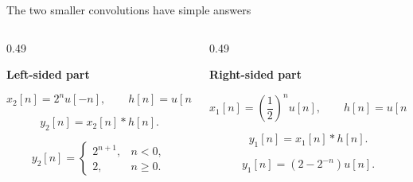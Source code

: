 \documentclass[aspectratio=169,11pt]{beamer}
\newcommand{\CardTitleSize}{\large}
\newcommand{\CardTitle}[1]{%
  \vspace{0.15cm}
  {\CardTitleSize\bfseries #1}\par
}
\begin{document}
\begin{frame}{The two smaller convolutions have simple answers}

\begin{columns}[c,totalwidth=\textwidth]






\begin{column}{0.49\textwidth}
\begin{OrangeCard}[halign=center,top=10pt,bottom=10pt]
\CardTitle{Left-sided part}

\vspace{0.04cm}

\[
x_2[n]=2^n u[-n],
\qquad
h[n]=u[n].
\]

\vspace{0.06cm}

\[
y_2[n]=x_2[n]*h[n].
\]

\vspace{0.06cm}

\[
y_2[n]=
\begin{cases}
2^{n+1}, & n<0,\\[3pt]
2, & n\ge 0.
\end{cases}
\]



\end{OrangeCard}
\end{column}






\begin{column}{0.49\textwidth}
\begin{BlueCard}[halign=center,top=10pt,bottom=10pt]
\CardTitle{Right-sided part}

\vspace{0.04cm}

\[
x_1[n]=\left(\frac12\right)^n u[n],
\qquad
h[n]=u[n].
\]

\vspace{0.06cm}

\[
y_1[n]=x_1[n]*h[n].
\]

\vspace{0.06cm}

\[
y_1[n]
=
\left(2-2^{-n}\right)u[n].
\]



\end{BlueCard}
\end{column}


\end{columns}

\end{frame}
\end{document}
